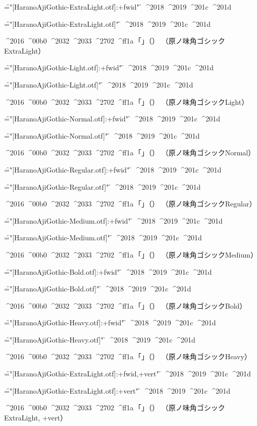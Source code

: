 
\nopagenumbers

\def\testfwid{%
  ^^^^2018
  ^^^^2019
  ^^^^201c
  ^^^^201d
}

\def\test{%
  \testfwid
  ^^^^2016
  ^^^^00b0
  ^^^^2032
  ^^^^2033
  ^^^^2702
  ^^^^ff1a
  ；「」（）}

\font\f="[HaranoAjiGothic-ExtraLight.otf]:+fwid" \f
\testfwid
\font\f="[HaranoAjiGothic-ExtraLight.otf]" \f
\test
（原ノ味角ゴシックExtraLight）\par

\font\f="[HaranoAjiGothic-Light.otf]:+fwid" \f
\testfwid
\font\f="[HaranoAjiGothic-Light.otf]" \f
\test
（原ノ味角ゴシックLight）\par

\font\f="[HaranoAjiGothic-Normal.otf]:+fwid" \f
\testfwid
\font\f="[HaranoAjiGothic-Normal.otf]" \f
\test
（原ノ味角ゴシックNormal）\par

\font\f="[HaranoAjiGothic-Regular.otf]:+fwid" \f
\testfwid
\font\f="[HaranoAjiGothic-Regular.otf]" \f
\test
（原ノ味角ゴシックRegular）\par

\font\f="[HaranoAjiGothic-Medium.otf]:+fwid" \f
\testfwid
\font\f="[HaranoAjiGothic-Medium.otf]" \f
\test
（原ノ味角ゴシックMedium）\par

\font\f="[HaranoAjiGothic-Bold.otf]:+fwid" \f
\testfwid
\font\f="[HaranoAjiGothic-Bold.otf]" \f
\test
（原ノ味角ゴシックBold）\par

\font\f="[HaranoAjiGothic-Heavy.otf]:+fwid" \f
\testfwid
\font\f="[HaranoAjiGothic-Heavy.otf]" \f
\test
（原ノ味角ゴシックHeavy）\par


\font\f="[HaranoAjiGothic-ExtraLight.otf]:+fwid,+vert" \f
\testfwid
\font\f="[HaranoAjiGothic-ExtraLight.otf]:+vert" \f
\test
（原ノ味角ゴシックExtraLight, +vert）\par

